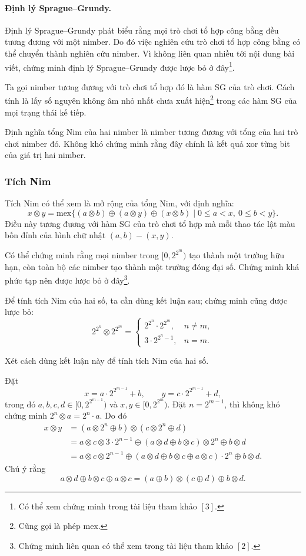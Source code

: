 \documentclass[11pt]{article}
\begin{document}
\paragraph{Định lý Sprague--Grundy.}
Định lý Sprague--Grundy phát biểu rằng mọi trò chơi tổ hợp công bằng đều tương
đương với một nimber. Do đó việc nghiên cứu trò chơi tổ hợp công bằng có thể
chuyển thành nghiên cứu nimber. Vì không liên quan nhiều tới nội dung bài viết,
chứng minh định lý Sprague--Grundy được lược bỏ ở đây\footnote{Có thể xem chứng
minh trong tài liệu tham khảo \([3]\).}.

Ta gọi nimber tương đương với trò chơi tổ hợp đó là hàm SG của trò chơi. Cách
tính là lấy số nguyên không âm nhỏ nhất chưa xuất hiện\footnote{Cũng gọi là phép
\(\mathrm{mex}\).} trong các hàm SG của mọi trạng thái kế tiếp.

Định nghĩa tổng Nim của hai nimber là nimber tương đương với tổng của hai trò
chơi nimber đó. Không khó chứng minh rằng đây chính là kết quả xor từng bit của
giá trị hai nimber.

\subsubsection{Tích Nim}

Tích Nim có thể xem là mở rộng của tổng Nim, với định nghĩa:
\[
  x\otimes y =
  \mathrm{mex}\{(a\otimes b)\oplus(a\otimes y)\oplus(x\otimes b)
  \mid 0\le a<x,\ 0\le b<y\}.
\]
Điều này tương đương với hàm SG của trò chơi tổ hợp mà mỗi thao tác lật màu bốn
đỉnh của hình chữ nhật \((a,b)-(x,y)\).

Có thể chứng minh rằng mọi nimber trong \([0,2^{2^m})\) tạo thành một trường hữu
hạn, còn toàn bộ các nimber tạo thành một trường đóng đại số. Chứng minh khá
phức tạp nên được lược bỏ ở đây\footnote{Chứng minh liên quan có thể xem trong
tài liệu tham khảo \([2]\).}.

Để tính tích Nim của hai số, ta cần dùng kết luận sau; chứng minh cũng được
lược bỏ:
\[
  2^{2^n}\otimes 2^{2^m}=
  \begin{cases}
    2^{2^n}\cdot 2^{2^m}, & n\ne m,\\
    3\cdot 2^{2^n-1}, & n=m.
  \end{cases}
\]

Xét cách dùng kết luận này để tính tích Nim của hai số.

Đặt
\[
  x=a\cdot 2^{2^{m-1}}+b,\qquad
  y=c\cdot 2^{2^{m-1}}+d,
\]
trong đó \(a,b,c,d\in[0,2^{2^{m-1}})\) và \(x,y\in[0,2^{2^m})\). Đặt
\(n=2^{m-1}\), thì không khó chứng minh \(2^n\otimes a=2^n\cdot a\). Do đó
\[
\begin{aligned}
x\otimes y
&=(a\otimes 2^n\oplus b)\otimes(c\otimes 2^n\oplus d)\\
&=a\otimes c\otimes 3\cdot 2^{n-1}
  \oplus(a\otimes d\oplus b\otimes c)\otimes 2^n\oplus b\otimes d\\
&=a\otimes c\otimes 2^{n-1}
  \oplus(a\otimes d\oplus b\otimes c\oplus a\otimes c)\cdot 2^n
  \oplus b\otimes d.
\end{aligned}
\]
Chú ý rằng
\[
  a\otimes d\oplus b\otimes c\oplus a\otimes c
  =(a\oplus b)\otimes(c\oplus d)\oplus b\otimes d.
\]
\end{document}

